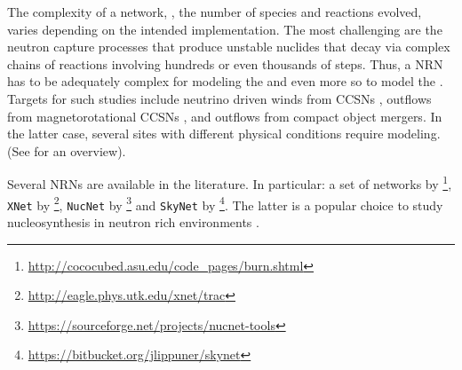 The complexity of a network, \ie, the number of species and reactions evolved, 
varies depending on the intended implementation. 
%
%
%
%
The most challenging are the neutron capture processes that produce unstable 
nuclides that decay via complex chains of reactions 
involving hundreds or even thousands of steps. 
%
Thus, a \ac{NRN} has to be adequately complex for modeling 
the \sproc{} \citep[\eg][]{Prantzos:1990,Kaeppeler:2011,Nishimura:2017zdi} 
and even more so to model the \rproc{}. 
%
Targets for such studies include neutrino driven winds from 
\acp{CCSN} \citep[\eg][]{Woosley:1992,Arcones:2010,Wanajo:2013},
outflows from magnetorotational \acp{CCSN} \citep[\eg][]{Winteler:2012,Nishimura:2015nca}, and 
outflows from compact object mergers. In the latter case, 
several sites with different physical conditions 
require modeling. %
%
(See \citet{Lippuner:2018phd} for an overview).

Several \acp{NRN} are available in the literature. 
In particular: a set of networks by 
\citet{Timmes:1999}\footnote{\url{http://cococubed.asu.edu/code_pages/burn.shtml}}, 
\texttt{XNet} by \citet{Hix:1999}\footnote{\url{http://eagle.phys.utk.edu/xnet/trac}}, 
\texttt{NucNet} by \citet{Meyer:2007}\footnote{\url{https://sourceforge.net/projects/nucnet-tools}}
and \texttt{SkyNet} by \citet{Lippuner:2015gwa}\footnote{\url{https://bitbucket.org/jlippuner/skynet}}.
%
The latter is a popular choice to study nucleosynthesis 
in neutron rich environments 
\citep[\eg][]{Lippuner:2015gwa,Radice:2016dwd,Radice:2018pdn}. 


